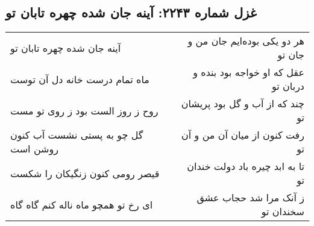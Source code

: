 \begin{center}
\section*{غزل شماره ۲۲۴۳: آینه جان شده چهره تابان تو}
\label{sec:2243}
\begin{longtable}{l p{0.5cm} r}
آینه جان شده چهره تابان تو
&&
هر دو یکی بوده‌ایم جان من و جان تو
\\
ماه تمام درست خانه دل آن توست
&&
عقل که او خواجه بود بنده و دربان تو
\\
روح ز روز الست بود ز روی تو مست
&&
چند که از آب و گل بود پریشان تو
\\
گل چو به پستی نشست آب کنون روشن است
&&
رفت کنون از میان آن من و آن تو
\\
قیصر رومی کنون زنگیکان را شکست
&&
تا به ابد چیره باد دولت خندان تو
\\
ای رخ تو همچو ماه ناله کنم گاه گاه
&&
ز آنک مرا شد حجاب عشق سخندان تو
\\
\end{longtable}
\end{center}
